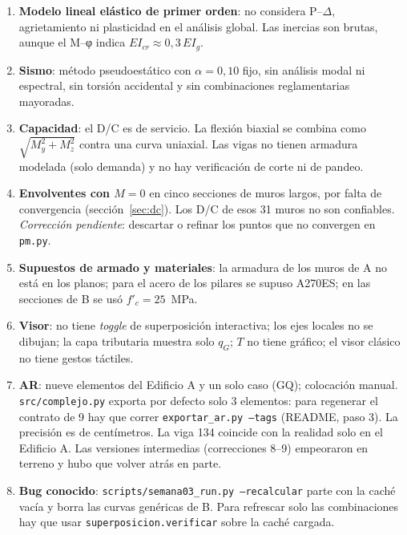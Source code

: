 \documentclass[11pt,a4paper]{article}
\begin{document}
\begin{enumerate}
  \item \textbf{Modelo lineal elástico de primer orden}: no considera P--$\Delta$,
        agrietamiento ni plasticidad en el análisis global. Las inercias son
        brutas, aunque el M--φ indica $EI_{cr} \approx 0{,}3\,EI_g$.
  \item \textbf{Sismo}: método pseudoestático con $\alpha = 0{,}10$ fijo, sin
        análisis modal ni espectral, sin torsión accidental y sin combinaciones
        reglamentarias mayoradas.
  \item \textbf{Capacidad}: el D/C es de servicio. La flexión biaxial se
        combina como $\sqrt{M_y^2+M_z^2}$ contra una curva uniaxial. Las vigas
        no tienen armadura modelada (solo demanda) y no hay verificación de
        corte ni de pandeo.
  \item \textbf{Envolventes con $M = 0$} en cinco secciones de muros largos,
        por falta de convergencia (sección~\ref{sec:dc}). Los D/C de esos
        31 muros no son confiables. \emph{Corrección pendiente}: descartar o
        refinar los puntos que no convergen en \texttt{pm.py}.
  \item \textbf{Supuestos de armado y materiales}: la armadura de los muros de A
        no está en los planos; para el acero de los pilares se supuso A270ES; en
        las secciones de B se usó $f'_c = 25$~MPa.
  \item \textbf{Visor}: no tiene \emph{toggle} de superposición interactiva;
        los ejes locales no se dibujan; la capa tributaria muestra solo $q_G$;
        $T$ no tiene gráfico; el visor clásico no tiene gestos táctiles.
  \item \textbf{AR}: nueve elementos del Edificio A y un solo caso (GQ);
        colocación manual. \texttt{src/complejo.py} exporta por defecto solo
        3 elementos: para regenerar el contrato de 9 hay que correr
        \texttt{exportar\_ar.py --tags} (README, paso 3). La
        precisión es de centímetros. La viga 134 coincide con la realidad solo
        en el Edificio A. Las versiones intermedias (correcciones 8--9)
        empeoraron en terreno y hubo que volver atrás en parte.
  \item \textbf{Bug conocido}: \texttt{scripts/semana03\_run.py --recalcular}
        parte con la caché vacía y borra las curvas genéricas de B. Para
        refrescar solo las combinaciones hay que usar
        \texttt{superposicion.verificar} sobre la caché cargada.
\end{enumerate}
\end{document}
